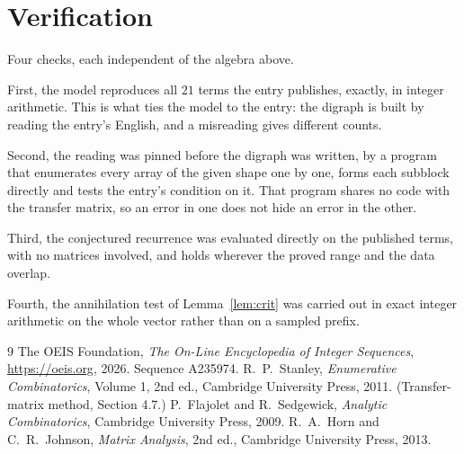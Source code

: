 \documentclass[11pt,a4paper]{article}
\theoremstyle{plain}
\theoremstyle{definition}
\begin{document}
\section{Verification}

Four checks, each independent of the algebra above.

First, the model reproduces all $21$ terms the entry publishes, exactly, in integer
arithmetic. This is what ties the model to the entry: the digraph is built by reading the
entry's English, and a misreading gives different counts.

Second, the reading was pinned before the digraph was written, by a program that enumerates
every array of the given shape one by one, forms each subblock directly and tests the entry's
condition on it. That program shares no code with the transfer matrix, so an error in one does
not hide an error in the other.

Third, the conjectured recurrence was evaluated directly on the published terms, with no
matrices involved, and holds wherever the proved range and the data overlap.

Fourth, the annihilation test of Lemma~\ref{lem:crit} was carried out in exact integer
arithmetic on the whole vector rather than on a sampled prefix.

\begin{thebibliography}{9}
 The OEIS Foundation, \emph{The On-Line Encyclopedia of Integer
Sequences}, \url{https://oeis.org}, 2026. Sequence A235974.
 R.~P.~Stanley, \emph{Enumerative Combinatorics}, Volume 1, 2nd ed.,
Cambridge University Press, 2011. (Transfer-matrix method, Section 4.7.)
 P.~Flajolet and R.~Sedgewick, \emph{Analytic Combinatorics}, Cambridge
University Press, 2009.
 R.~A.~Horn and C.~R.~Johnson, \emph{Matrix Analysis}, 2nd ed., Cambridge
University Press, 2013.
\end{thebibliography}
\end{document}
